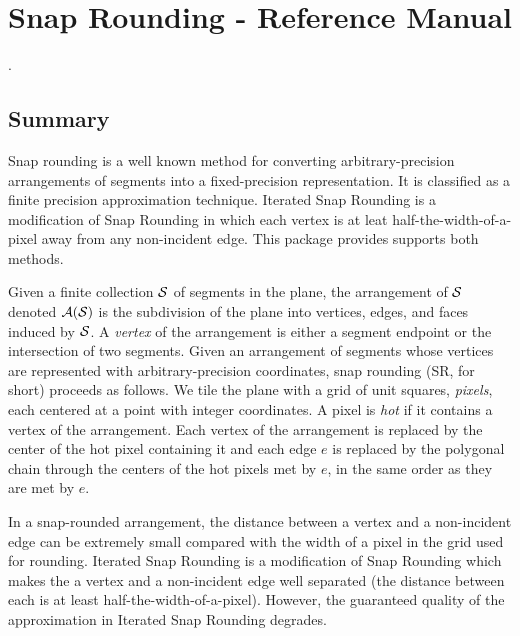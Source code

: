 
\chapter{Snap Rounding - Reference Manual}
\label{chapterSnapRoundibgRef}
\ccChapterRelease\snapRoundingRev. \ \snapRoundingDate\\


\section*{Summary}

Snap rounding is a well known method for converting
arbitrary-precision arrangements of segments into a fixed-precision
representation. It is classified as a finite precision approximation 
technique. Iterated Snap Rounding is a modification of Snap Rounding in
which each vertex is at leat half-the-width-of-a-pixel away from any
non-incident edge.
This package provides supports both methods.

Given a finite collection $\S$ of segments in the plane, the
arrangement of $\S$ denoted $\A(\S)$ is the subdivision of the plane
into vertices, edges, and faces induced by $\S$. %
A {\it vertex\/} of the arrangement is either a segment endpoint or
the intersection of two segments. Given an arrangement of segments
whose vertices are represented with arbitrary-precision coordinates,
snap rounding (SR, for short) proceeds as follows.  We tile the plane
with a grid of unit squares, {\it pixels}, each centered at a point
with integer coordinates. A pixel is {\it hot\/} if it contains a
vertex of the arrangement. Each vertex of the arrangement is replaced
by the center of the hot pixel containing it and each edge $e$ is
replaced by the polygonal chain through the centers of the hot pixels
met by $e$, in the same order as they are met by $e$.

In a snap-rounded arrangement, the distance between a vertex and
a non-incident edge can be extremely small compared with the width of a
pixel in the grid used for rounding. Iterated Snap Rounding is a modification
of Snap Rounding which makes the a vertex and a non-incident edge well separated
(the distance between each is at least half-the-width-of-a-pixel).
However, the guaranteed quality of the approximation in Iterated Snap Rounding
degrades.

